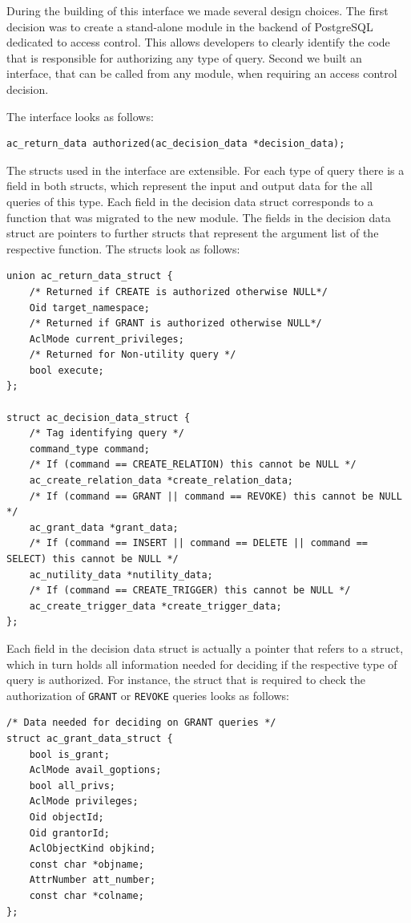 During the building of this interface we made several design choices.
%
The first decision was to create a stand-alone module in the backend of PostgreSQL dedicated to access control.
This allows developers to clearly identify the code that is responsible for authorizing any type of query.
%
Second we built an interface, that can be called from any module, when requiring an access control decision.

The interface looks as follows:
%
\begin{lstlisting}[frame=single, style=customc]
ac_return_data authorized(ac_decision_data *decision_data);
\end{lstlisting}
%
The structs used in the interface are extensible. For each type of query there is a field in both structs, which represent the input and output data for the all queries of this type.
%
Each field in the decision data struct corresponds to a function that was migrated to the new module.
%
The fields in the decision data struct are pointers to further structs that represent the argument list of the respective function.
%
The structs look as follows: 
%
\begin{lstlisting}[frame=single, style=customc]
union ac_return_data_struct {
	/* Returned if CREATE is authorized otherwise NULL*/
	Oid target_namespace; 
	/* Returned if GRANT is authorized otherwise NULL*/
	AclMode current_privileges; 
	/* Returned for Non-utility query */
	bool execute; 
};

struct ac_decision_data_struct {
	/* Tag identifying query */
	command_type command;
	/* If (command == CREATE_RELATION) this cannot be NULL */
	ac_create_relation_data *create_relation_data; 
	/* If (command == GRANT || command == REVOKE) this cannot be NULL */
	ac_grant_data *grant_data; 
	/* If (command == INSERT || command == DELETE || command == SELECT) this cannot be NULL */
	ac_nutility_data *nutility_data; 
	/* If (command == CREATE_TRIGGER) this cannot be NULL */
	ac_create_trigger_data *create_trigger_data; 
};
\end{lstlisting}
%
Each field in the decision data struct is actually a pointer that refers to a struct, which in turn holds all information needed for deciding if the respective type of query is authorized.
%
For instance, the struct that is required to check the authorization of \texttt{GRANT} or \texttt{REVOKE} queries looks as follows:
%
\begin{lstlisting}[frame=single, style=customc]
/* Data needed for deciding on GRANT queries */
struct ac_grant_data_struct {
	bool is_grant;
	AclMode avail_goptions;
	bool all_privs;
	AclMode privileges;
	Oid objectId;
	Oid grantorId;
	AclObjectKind objkind;
	const char *objname;
	AttrNumber att_number;
	const char *colname;
};
\end{lstlisting}
